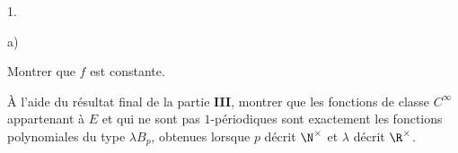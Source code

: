 \documentclass[11pt]{article}%
\begin{document}
\begin{noliste}{1.}
\begin{noliste}{a)}
\item Montrer que $f$ est constante.
\end{noliste}

\item À l'aide du résultat final de la partie \textbf{III}, montrer que
les
fonctions de classe $C^{\infty }$ appartenant à $E$ et qui ne sont pas
$1$-périodiques sont exactement les fonctions polynomiales du type
$\lambda B_{p}$, obtenues lorsque $p$ décrit $\N^{\times }$ et $\lambda
$ décrit $\R^{\times }$.
\end{noliste}

\label{fin}
\end{document}
